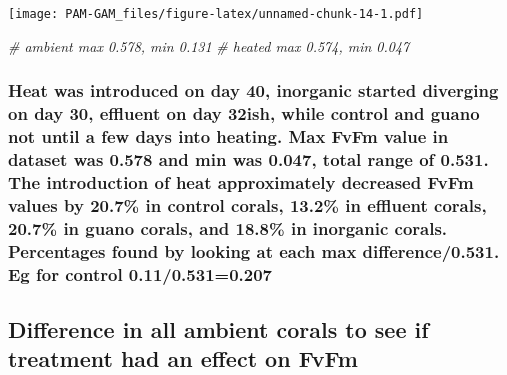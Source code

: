 \documentclass[
]{article}
\newenvironment{Shaded}{\begin{snugshade}}{\end{snugshade}}
\newcommand{\CommentTok}[1]{\textcolor[rgb]{0.56,0.35,0.01}{\textit{#1}}}
\begin{document}
\texttt{[image: PAM-GAM\_files/figure-latex/unnamed-chunk-14-1.pdf]}

\begin{Shaded}
\begin{Highlighting}[]
\CommentTok{\# ambient max 0.578, min 0.131}
\CommentTok{\# heated max 0.574, min 0.047}
\end{Highlighting}
\end{Shaded}

\hypertarget{heat-was-introduced-on-day-40-inorganic-started-diverging-on-day-30-effluent-on-day-32ish-while-control-and-guano-not-until-a-few-days-into-heating.-max-fvfm-value-in-dataset-was-0.578-and-min-was-0.047-total-range-of-0.531.-the-introduction-of-heat-approximately-decreased-fvfm-values-by-20.7-in-control-corals-13.2-in-effluent-corals-20.7-in-guano-corals-and-18.8-in-inorganic-corals.-percentages-found-by-looking-at-each-max-difference0.531.-eg-for-control-0.110.5310.207}{%
\subsubsection{Heat was introduced on day 40, inorganic started
diverging on day 30, effluent on day 32ish, while control and guano not
until a few days into heating. Max FvFm value in dataset was 0.578 and
min was 0.047, total range of 0.531. The introduction of heat
approximately decreased FvFm values by 20.7\% in control corals, 13.2\%
in effluent corals, 20.7\% in guano corals, and 18.8\% in inorganic
corals. Percentages found by looking at each max difference/0.531. Eg
for control
0.11/0.531=0.207}\label{heat-was-introduced-on-day-40-inorganic-started-diverging-on-day-30-effluent-on-day-32ish-while-control-and-guano-not-until-a-few-days-into-heating.-max-fvfm-value-in-dataset-was-0.578-and-min-was-0.047-total-range-of-0.531.-the-introduction-of-heat-approximately-decreased-fvfm-values-by-20.7-in-control-corals-13.2-in-effluent-corals-20.7-in-guano-corals-and-18.8-in-inorganic-corals.-percentages-found-by-looking-at-each-max-difference0.531.-eg-for-control-0.110.5310.207}}

\hypertarget{difference-in-all-ambient-corals-to-see-if-treatment-had-an-effect-on-fvfm-1}{%
\subsection{Difference in all ambient corals to see if treatment had an
effect on
FvFm}\label{difference-in-all-ambient-corals-to-see-if-treatment-had-an-effect-on-fvfm-1}}
\end{document}
